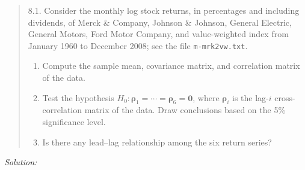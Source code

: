 \documentclass[11pt,a4paper]{article}
\newif\ifsolucoes
\newcommand{\espacoresol}{4.5cm}   %
\newcommand{\resolespaco}{\ifsolucoes\else\par\textit{Solution:}\vspace{\espacoresol}\par\fi}
\begin{document}
\begin{quote}\small
8.1. Consider the monthly log stock returns, in percentages and including dividends, of Merck \&
Company, Johnson \& Johnson, General Electric, General Motors, Ford Motor Company, and
value-weighted index from January 1960 to December 2008; see the file \texttt{m-mrk2vw.txt}.
\begin{enumerate}[label=(\alph*),leftmargin=2em]
\item Compute the sample mean, covariance matrix, and correlation matrix of the data.
\item Test the hypothesis $H_0:\bm{\rho}_1=\cdots=\bm{\rho}_6=\bm{0}$, where $\bm{\rho}_i$ is the lag-$i$
cross-correlation matrix of the data. Draw conclusions based on the 5\% significance level.
\item Is there any lead--lag relationship among the six return series?
\end{enumerate}
\end{quote}
\resolespaco
\end{document}
